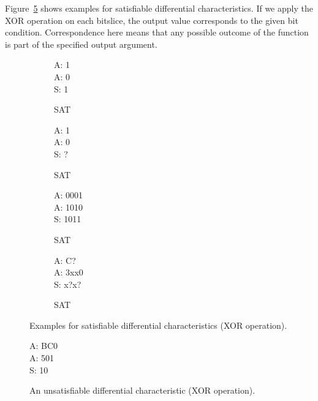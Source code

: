 Figure~\ref{dc:xor-examples} shows examples for satisfiable differential characteristics. If we apply the XOR operation on each bitslice, the output value corresponds to the given bit condition. Correspondence here means that any possible outcome of the function is part of the specified output argument.
%
\begin{figure}[t]
  \begin{center}
    \begin{subfigure}[b]{0.23\textwidth}
      \begin{diffchar}
        A: 1 \\
        A: 0 \\
        S: 1
      \end{diffchar}
      \caption{SAT}
      \label{dc:xor1}
    \end{subfigure}%
    \begin{subfigure}[b]{0.23\textwidth}
      \begin{diffchar}
        A: 1 \\
        A: 0 \\
        S: ?
      \end{diffchar}
      \caption{SAT}
      \label{dc:xor2}
    \end{subfigure}%
    \begin{subfigure}[b]{0.23\textwidth}
      \begin{diffchar}
        A: 0001 \\
        A: 1010 \\
        S: 1011
      \end{diffchar}
      \caption{SAT}
      \label{dc:xor3}
    \end{subfigure}%
    \begin{subfigure}[b]{0.23\textwidth}
      \begin{diffchar}
        A: C\textendash{}\textendash{}? \\
        A: 3xx0 \\
        S: x?x?
      \end{diffchar}
      \caption{SAT}
      \label{dc:xor4}
    \end{subfigure}
    \caption{Examples for satisfiable differential characteristics (XOR operation).}
    \label{dc:xor-examples}
  \end{center}
\end{figure}
\begin{figure}[t]
  \begin{center}
    \begin{diffchar}
      A: BC0 \\
      A: 501 \\
      S: \textendash{}10
    \end{diffchar}
    \caption{An unsatisfiable differential characteristic (XOR operation).}
    \label{dc:xor-faulty}
  \end{center}
\end{figure}

